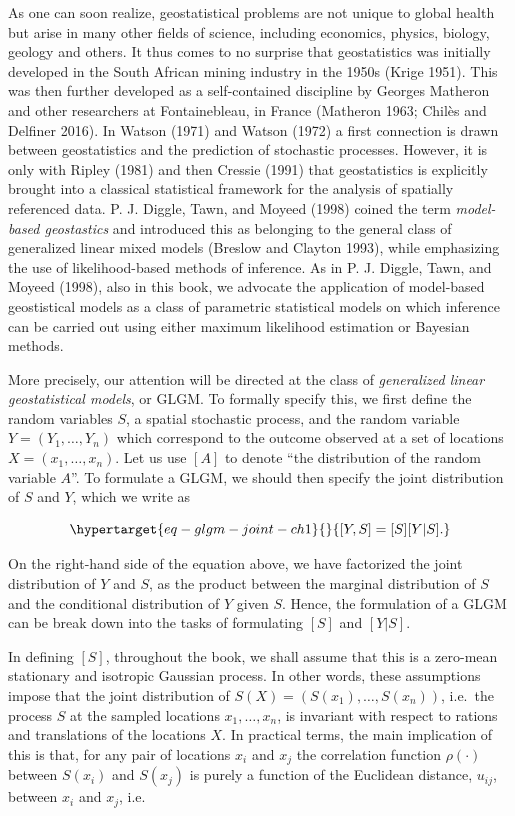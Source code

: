 \documentclass[
  letterpaper,
]{krantz}
\begin{document}
As one can soon realize, geostatistical problems are not unique to
global health but arise in many other fields of science, including
economics, physics, biology, geology and others. It thus comes to no
surprise that geostatistics was initially developed in the South African
mining industry in the 1950s (Krige 1951). This was then further
developed as a self-contained discipline by Georges Matheron and other
researchers at Fontainebleau, in France (Matheron 1963; Chilès and
Delfiner 2016). In Watson (1971) and Watson (1972) a first connection is
drawn between geostatistics and the prediction of stochastic processes.
However, it is only with Ripley (1981) and then Cressie (1991) that
geostatistics is explicitly brought into a classical statistical
framework for the analysis of spatially referenced data. P. J. Diggle,
Tawn, and Moyeed (1998) coined the term \emph{model-based geostastics}
and introduced this as belonging to the general class of generalized
linear mixed models (Breslow and Clayton 1993), while emphasizing the
use of likelihood-based methods of inference. As in P. J. Diggle, Tawn,
and Moyeed (1998), also in this book, we advocate the application of
model-based geostistical models as a class of parametric statistical
models on which inference can be carried out using either maximum
likelihood estimation or Bayesian methods.

More precisely, our attention will be directed at the class of
\emph{generalized linear geostatistical models}, or GLGM. To formally
specify this, we first define the random variables \(S\), a spatial
stochastic process, and the random variable \(Y= (Y_1, \ldots, Y_n)\)
which correspond to the outcome observed at a set of locations
\(X = (x_1, \ldots, x_n)\). Let us use \([A]\) to denote ``the
distribution of the random variable \(A\)''. To formulate a GLGM, we
should then specify the joint distribution of \(S\) and \(Y\), which we
write as

\begin{equation}\protect\hypertarget{eq-glgm-joint-ch1}{}{
[Y, S] = [S] [Y | S].
}\label{eq-glgm-joint-ch1}\end{equation}

On the right-hand side of the equation above, we have factorized the
joint distribution of \(Y\) and \(S\), as the product between the
marginal distribution of \(S\) and the conditional distribution of \(Y\)
given \(S\). Hence, the formulation of a GLGM can be break down into the
tasks of formulating \([S]\) and \([Y | S]\).

In defining \([S]\), throughout the book, we shall assume that this is a
zero-mean stationary and isotropic Gaussian process. In other words,
these assumptions impose that the joint distribution of
\(S(X) = (S(x_1),\ldots,S(x_n))\), i.e.~the process \(S\) at the sampled
locations \(x_1, \ldots, x_n\), is invariant with respect to rations and
translations of the locations \(X\). In practical terms, the main
implication of this is that, for any pair of locations \(x_i\) and
\(x_j\) the correlation function \(\rho(\cdot)\) between \(S(x_i)\) and
\(S(x_j)\) is purely a function of the Euclidean distance, \(u_{ij}\),
between \(x_i\) and \(x_j\), i.e.
\end{document}
